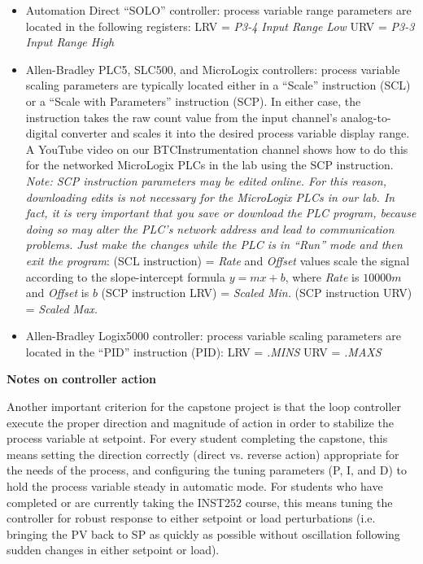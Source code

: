 \begin{itemize}
\vskip 10pt
\item{} Automation Direct ``SOLO'' controller: process variable range parameters are located in the following registers:
\itemitem{} LRV = {\it P3-4 Input Range Low}
\itemitem{} URV = {\it P3-3 Input Range High}
\vskip 10pt
\item{} Allen-Bradley PLC5, SLC500, and MicroLogix controllers: process variable scaling parameters are typically located either in a ``Scale'' instruction (SCL) or a ``Scale with Parameters'' instruction (SCP).  In either case, the instruction takes the raw count value from the input channel's analog-to-digital converter and scales it into the desired process variable display range.  A YouTube video on our BTCInstrumentation channel shows how to do this for the networked MicroLogix PLCs in the lab using the SCP instruction.  {\it Note: SCP instruction parameters may be edited online.  For this reason, downloading edits is not necessary for the MicroLogix PLCs in our lab.  In fact, it is very important that you  save or download the PLC program, because doing so may alter the PLC's network address and lead to communication problems.  Just make the changes while the PLC is in ``Run'' mode and then exit the program}:
\itemitem{} (SCL instruction) = {\it Rate} and {\it Offset} values scale the signal according to the slope-intercept formula $y = mx + b$, where {\it Rate} is $10000 m$ and {\it Offset} is $b$
\itemitem{} (SCP instruction LRV) = {\it Scaled Min.}
\itemitem{} (SCP instruction URV) = {\it Scaled Max.}
\vskip 10pt
\item{} Allen-Bradley Logix5000 controller: process variable scaling parameters are located in the ``PID'' instruction (PID):
\itemitem{} LRV = {\it .MINS}
\itemitem{} URV = {\it .MAXS}
\end{itemize}








\vfil \eject

\centerline{\bf Notes on controller action}

\vskip 10pt

Another important criterion for the capstone project is that the loop controller execute the proper direction and magnitude of action in order to stabilize the process variable at setpoint.  For every student completing the capstone, this means setting the direction correctly (direct vs. reverse action) appropriate for the needs of the process, and configuring the tuning parameters (P, I, and D) to hold the process variable steady in automatic mode.  For students who have completed or are currently taking the INST252 course, this means tuning the controller for robust response to either setpoint or load perturbations (i.e. bringing the PV back to SP as quickly as possible without oscillation following sudden changes in either setpoint or load).

